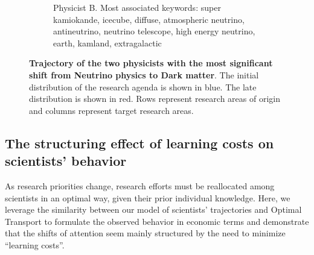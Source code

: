 \documentclass{article}
\begin{document}
\begin{figure}[h]
\begin{subfigure}{0.45\textwidth}
    \caption{Physicist B. Most associated keywords: super kamiokande, icecube, diffuse, atmospheric neutrino, antineutrino, neutrino telescope, high energy neutrino, earth, kamland, extragalactic}
    \label{fig:J.F.Beacom.1}
\end{subfigure}
\caption{\textbf{Trajectory of the two physicists with the most significant shift from Neutrino physics to Dark matter}. The initial distribution of the research agenda is shown in blue. The late distribution is shown in red. Rows represent research areas of origin and columns represent target research areas.}
\label{fig:turns_neutrinos_dm}
\end{figure}

\subsection{\label{sec:optimal-transport}The structuring effect of learning costs on scientists' behavior}

As research priorities change, research efforts must be reallocated among scientists in an optimal way, given their prior individual knowledge. Here, we leverage the similarity between our model of scientists' trajectories and Optimal Transport \citep{muzellec2017tsallis,li2019learning} to formulate the observed behavior in economic terms and demonstrate that the shifts of attention seem mainly structured by the need to minimize ``learning costs''. 
\end{document}
